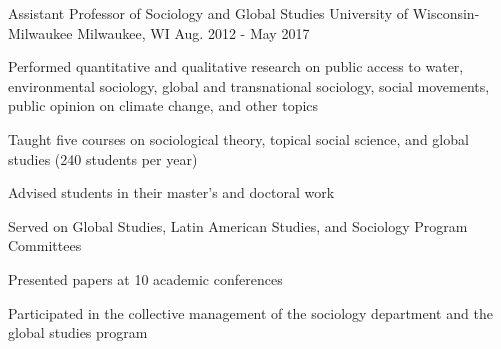 \begin{cventries}
  \cventry
    {Assistant Professor of Sociology and Global Studies}
    {University of Wisconsin-Milwaukee}
    {Milwaukee, WI}
    {Aug. 2012 - May 2017}
    {
      \begin{cvitems}
        \item {Performed quantitative and qualitative research on public access to water, environmental sociology, global and transnational sociology, social movements, public opinion on climate change, and other topics}
        \item {Taught five courses on sociological theory, topical social science, and global studies (240 students per year)}
        \item {Advised students in their master’s and doctoral work}
        \item {Served on Global Studies, Latin American Studies, and Sociology Program Committees}
        \item {Presented papers at 10 academic conferences}
        \item {Participated in the collective management of the sociology department and the global studies program}
      \end{cvitems}
    }
\end{cventries}
